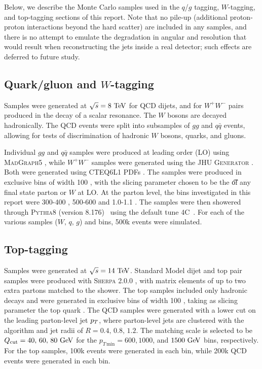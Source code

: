 Below, we describe the Monte Carlo samples used in the $q$/$g$ tagging,
$W$-tagging, and top-tagging sections of this report. Note
that no pile-up (additional proton-proton
interactions beyond the hard scatter) are included in any samples, and there is no
attempt to emulate the degradation in angular and \pt resolution that
would result when reconstructing the jets inside a real detector; such effects are deferred to 
future study.


\subsection{Quark/gluon and $W$-tagging}

Samples were generated at $\sqrt{s} = 8\TeV$ for QCD dijets, and for $W^+W^-$
pairs produced in the decay of a scalar resonance. The $W$ bosons are
decayed hadronically. The QCD events were split into subsamples of $gg$ and
$q\bar{q}$ events, allowing for tests of discrimination of hadronic $W$ bosons,
quarks, and gluons.

Individual $gg$ and $q\bar{q}$ samples were produced at leading order (LO)
using \textsc{MadGraph5} \cite{Alwall:2011uj}, while $W^+W^-$ samples were generated
using the \textsc{JHU Generator} \cite{Gao:2010qx,Bolognesi:2012mm,Anderson:2013afp}.
Both were generated using \textsc{CTEQ6L1} PDFs \cite{Pumplin:2002vw}. The samples
were produced in exclusive \pt bins of width 100 \GeV, with the slicing parameter
chosen to be the \t of any final state parton or $W$ at LO. At the parton level,
the \pt bins investigated in this report were 300-400 \GeV, 500-600 \GeV and
1.0-1.1 \TeV. 
The samples were then showered through \textsc{Pythia8}
(version 8.176)~\cite{Sjostrand:2007gs} using the default tune
4C~\cite{Buckley:2011ms}. For each of the various samples ($W,\,q,\,g$) and \pt bins,
500k events were simulated.





\subsection{Top-tagging} \label{sec:top-samples}
Samples were generated at $\sqrt{s}=14\TeV$. Standard Model dijet and top pair
samples were produced with \textsc{Sherpa} 2.0.0 \cite{Gleisberg:2008ta,Schumann:2007mg,Krauss:2001iv,Gleisberg:2008fv,Hoeche:2009rj,Schonherr:2008av}, with matrix elements of up
to two extra partons matched to the shower. The top samples included only
hadronic decays and  were generated in exclusive \pt bins of width 100 \GeV,
taking as slicing parameter the top quark \pt. The QCD samples were generated
with a lower cut on the leading parton-level jet $p_T$, where parton-level jets
are clustered with the \antikt algorithm and jet radii of
$R= 0.4,\,0.8,\,1.2$. The matching scale is selected to be
$Q_{\rm cut}=40,\,60,\,80 \GeV$ for the $p_{T\,\text{min}}=600, 1000$, and
$1500 \GeV$ bins, respectively. For the top samples, 100k events were generated
in each bin, while 200k QCD events were generated in each bin.

